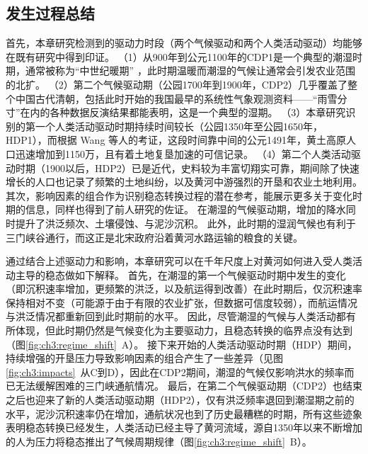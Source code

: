 \subsection{发生过程总结}
首先，本章研究检测到的驱动力时段（两个气候驱动和两个人类活动驱动）均能够在既有研究中得到印证。
（1）从900年到公元1100年的CDP1是一个典型的潮湿时期，通常被称为“中世纪暖期” \cite{zhang1993, zhang1994, man2014}，此时期温暖而潮湿的气候让通常会引发农业范围的北扩\cite{TanQiXiang1996,GeQuanSheng2011}。
（2）第二个气候驱动期（公园1700年到1900年，CDP2）几乎覆盖了整个中国古代清朝，包括此时开始的我国最早的系统性气象观测资料——“雨雪分寸”在内的各种数据反演结果都能表明，这是一个典型的湿期\cite{hao2021, ge2008}。
（3）本章研究识别的第一个人类活动驱动时期持续时间较长（公园1350年至公园1650年，HDP1），而根据 Wang 等人的考证，这段时间靠中间的公元1491年，黄土高原人口迅速增加到1150万，且有着土地复垦加速的可信记录\cite{wang2006b}。
（4）第二个人类活动驱动时期（1900以后，HDP2）已是近代，史料较为丰富切翔实可靠，期间除了快速增长的人口也记录了频繁的土地纠纷，以及黄河中游强烈的开垦和农业土地利用\cite{GeJianXiong2005}。
其次，影响因素的组合作为识别稳态转换过程的潜在参考，能展示更多关于变化时期的信息，同样也得到了前人研究的佐证。
在潮湿的气候驱动期，增加的降水同时提升了洪泛频次、土壤侵蚀、与泥沙沉积\cite{chen2012}。
此外，此时期的湿润气候也有利于三门峡谷通行，而这正是北宋政府沿着黄河水路运输的粮食的关键\cite{WangShouChun1993}。

通过结合上述驱动力和影响，本章研究可以在千年尺度上对黄河如何进入受人类活动主导的稳态做如下解释。
首先，在潮湿的第一个气候驱动时期中发生的变化（即沉积速率增加，更频繁的洪泛，以及航运得到改善）在此时期后，仅沉积速率保持相对不变（可能源于由于有限的农业扩张，但数据可信度较弱），而航运情况与洪泛情况都重新回到此时期前的水平。
因此，尽管潮湿的气候与人类活动都有所体现，但此时期仍然是气候变化为主要驱动力，且稳态转换的临界点没有达到（图\ref{fig:ch3:regime_shift}~A）。
接下来开始的人类活动驱动时期（HDP）期间，持续增强的开垦压力导致影响因素的组合产生了一些差异（见图\ref{fig:ch3:impacts}~从C到D），因此在CDP2期间，潮湿的气候仅影响洪水的频率而已无法缓解困难的三门峡通航情况。
最后，在第二个气候驱动期（CDP2）也结束之后也迎来了新的人类活动驱动期（HDP2），仅有洪泛频率退回到潮湿期之前的水平，泥沙沉积速率仍在增加，通航状况也到了历史最糟糕的时期，所有这些迹象表明稳态转换已经发生，人类活动已经主导了黄河流域，源自1350年以来不断增加的人为压力将稳态推出了气候周期规律（图\ref{fig:ch3:regime_shift}~B）。

